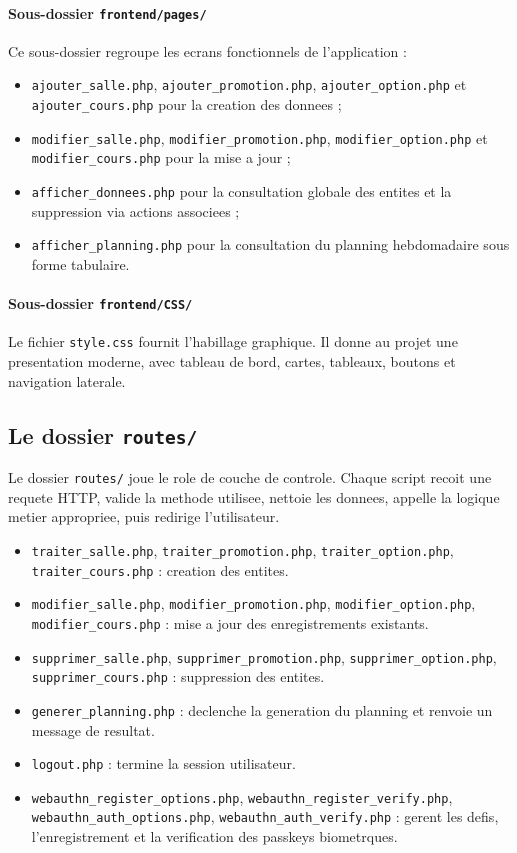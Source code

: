 \documentclass[12pt,a4paper]{article}
\begin{document}
\paragraph{Sous-dossier \texttt{frontend/pages/}}
Ce sous-dossier regroupe les ecrans fonctionnels de l'application :
\begin{itemize}
    \item \texttt{ajouter\_salle.php}, \texttt{ajouter\_promotion.php}, \texttt{ajouter\_option.php} et \texttt{ajouter\_cours.php} pour la creation des donnees ;
    \item \texttt{modifier\_salle.php}, \texttt{modifier\_promotion.php}, \texttt{modifier\_option.php} et \texttt{modifier\_cours.php} pour la mise a jour ;
    \item \texttt{afficher\_donnees.php} pour la consultation globale des entites et la suppression via actions associees ;
    \item \texttt{afficher\_planning.php} pour la consultation du planning hebdomadaire sous forme tabulaire.
\end{itemize}

\paragraph{Sous-dossier \texttt{frontend/CSS/}}
Le fichier \texttt{style.css} fournit l'habillage graphique. Il donne au projet une presentation moderne, avec tableau de bord, cartes, tableaux, boutons et navigation laterale.

\subsection{Le dossier \texttt{routes/}}
Le dossier \texttt{routes/} joue le role de couche de controle. Chaque script recoit une requete HTTP, valide la methode utilisee, nettoie les donnees, appelle la logique metier appropriee, puis redirige l'utilisateur.

\begin{itemize}
    \item \texttt{traiter\_salle.php}, \texttt{traiter\_promotion.php}, \texttt{traiter\_option.php}, \texttt{traiter\_cours.php} : creation des entites.
    \item \texttt{modifier\_salle.php}, \texttt{modifier\_promotion.php}, \texttt{modifier\_option.php}, \texttt{modifier\_cours.php} : mise a jour des enregistrements existants.
    \item \texttt{supprimer\_salle.php}, \texttt{supprimer\_promotion.php}, \texttt{supprimer\_option.php}, \texttt{supprimer\_cours.php} : suppression des entites.
    \item \texttt{generer\_planning.php} : declenche la generation du planning et renvoie un message de resultat.
    \item \texttt{logout.php} : termine la session utilisateur.
    \item \texttt{webauthn\_register\_options.php}, \texttt{webauthn\_register\_verify.php}, \texttt{webauthn\_auth\_options.php}, \texttt{webauthn\_auth\_verify.php} : gerent les defis, l'enregistrement et la verification des passkeys biometrques.
\end{itemize}
\end{document}
